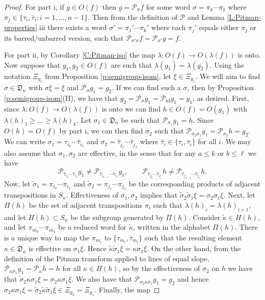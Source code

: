 \documentclass[11pt]{article}
\newcommand{\ka}{\kappa}
\newcommand{\sig}{\sigma}
\newcommand{\la}{\lambda}
\newcommand{\cP}{\mathcal{P}}
\newcommand{\id}{\text{id}}
\theoremstyle{definition} %
\theoremstyle{remark} %
\begin{document}
\begin{proof}
For part i, if $g \in O(f)$ then $g = \cP_\sig f$ for some word $\sig = \pi_k \cdots \pi_1$ where  $\pi_j \in \{\tau_i, \bar \tau_i: i = 1, \dots, n-1\}$. Then from the definition of $\cP$ and Lemma \ref{L:Pitman-properties}.iii there exists a word $\sig' = \pi_1' \cdots \pi_k'$ where each $\pi_j'$ equals either $\pi_j$ or its barred/unbarred version, such that $\cP_{\sig' \sig} f = \cP_{\sig'} g = f$.

 For part ii, by Corollary \ref{C:Pitman-iso} the map $\la:O(f) \to O(\la(f))$ is onto. Now suppose that $g_1, g_2 \in O(f)$ are such that $\la(g_1) = \la(g_2)$. Using the notation $\Xi_{g_1}$ from Proposition \ref{p:semigroup-isom}, let $\xi \in \Xi_{g_1}$. We will aim to find $\sig \in \mathfrak{D}_n$ with $\sig \xi = \xi$ and $\cP_\sig g_1 = g_2$. If we can find such a $\sig$, then by Proposition \ref{p:semigroup-isom}(II), we have that $g_2 = \cP_\sig g_1 = \cP_{\id} g_1 = g_1$, as desired. First, since $\la:O(f) \to O(\la(f))$ is onto we can find $h \in O(f) = O(g_1)$ with $\la(h)_1 \ge \dots \ge \la(h)_k$. Let $\sig_1 \in \mathfrak{D}_n$ be such that $\cP_{\sig_1} g_1 = h$. Since $O(h) = O(f)$ by part i, we can then find $\sig_2$ such that $\cP_{\sig_2 \sig_1} g_1 = \cP_{\sig_2} h = g_2$. We can write $\sig_1 = \hat \tau_{i_k} \cdots \hat \tau_{i_1}$ and $\sig_2 = \hat \tau_{j_\ell} \cdots \hat \tau_{j_1}$ where $\hat \tau_i \in \{\tau_i, \bar \tau_i\}$ for all $i$. 
 We may also assume that $\sig_1, \sig_2$ are effective, in the sense that for any $a \le k$ or $b \le \ell$ we have
 \begin{equation*}
 \label{E:effective}
 \cP_{\hat \tau_{i_a} \cdots \hat \tau_{i_1}} g_1 \ne  \cP_{\hat \tau_{i_{a-1}} \cdots \hat \tau_{i_1}} g_1, \qquad  \cP_{\hat \tau_{j_b} \cdots \hat \tau_{j_1}} h \ne  \cP_{\hat \tau_{j_{b-1}} \cdots \hat \tau_{j_1}} h.
 \end{equation*}
Now, let $\tilde \sig_1 = \pi_{i_k} \cdots \pi_{i_1}$ and $\tilde \sig_2 = \pi_{j_\ell} \cdots  \pi_{j_1}$ be the corresponding products of adjacent transpositions in $S_n$. Effectiveness of $\sig_1, \sig_2$ implies that $\tilde \sig_2 \tilde \sig_1 \xi = \sig_2 \sig_1 \xi$. Next, let $\Pi(h)$ be the set of adjacent transpositions $\pi_i$ such that $\la(h)_i = \la(h)_{i+1}$, and let $H(h) \subset S_n$ be the subgroup generated by $\Pi(h)$. Consider $\tilde \ka \in H(h)$, and let $\pi_{m_k} \cdots \pi_{m_1}$ be a reduced word for $\tilde \ka$, written in the alphabet $\Pi(h)$. There is a unique way to map the $\pi_{m_i}$ to $\{\tau_{m_i}, \bar \tau_{m_i}\}$ such that the resulting element $\ka \in \mathfrak{D}_n$ is effective on $\sig_1 \xi$. Hence $\tilde \ka \tilde \sig_1 \xi = \kappa \sig_1 \xi$. On the other hand, from the definition of the Pitman transform applied to lines of equal slope, $ \cP_{\ka \sig_1} g_1 = \cP_{\kappa} h  = h$ for all $\ka \in H(h)$, so by the effectiveness of $\sig_2$ on $h$ we have that $\tilde \sig_2 \ka \sig_1 \xi = \sig_2 \ka \sig_1 \xi$. We also have that $\cP_{\sig_2 \ka \sig_1} g_1 = g_2$ and hence $\sig_2 \ka \sig_1 \xi = \tilde \sig_2 \tilde \ka \tilde \sig_1 \xi \in \Xi_{g_2} = \Xi_{g_1}$. Finally, the map

\end{proof}
\end{document}
